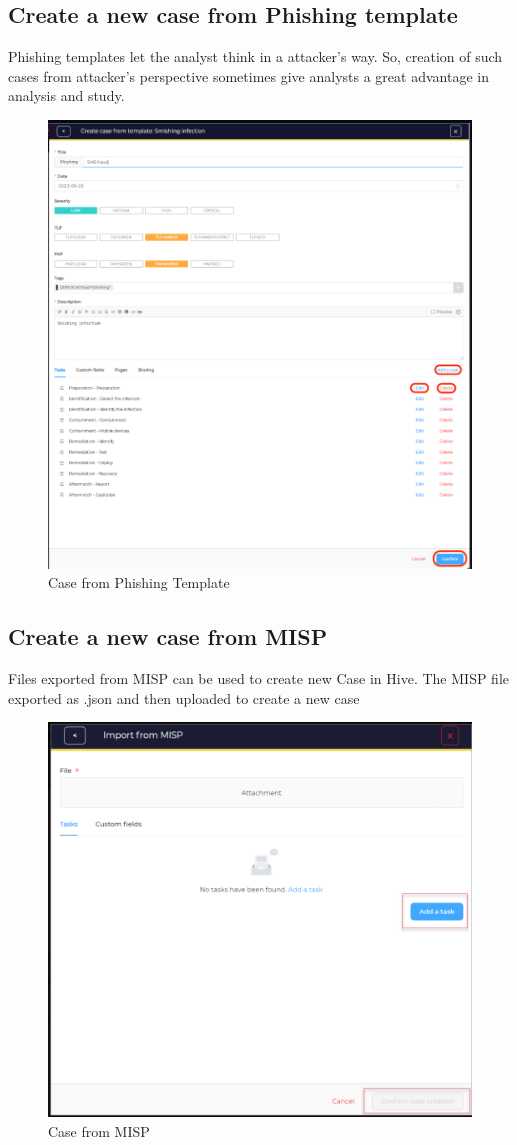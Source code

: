 \documentclass{book}
\begin{document}
\subsection{Create a new case from Phishing template}
Phishing templates let the analyst think in a attacker’s way. So, creation of such cases from attacker’s
perspective sometimes give analysts a great advantage in analysis and study.
\bigskip
\begin{figure}[h]
    \centering
    \includegraphics[width=.8\linewidth]{Case_images/casefromphishingtemplate.png}
    \caption{Case from Phishing Template}
    \label{fig:casefromphishingtemplate}
\end{figure}

\newpage

\subsection{Create a new case from MISP}
Files exported from MISP can be used to create new Case in Hive. The MISP file exported as .json and then uploaded to create a new case
\bigskip
\begin{figure}[h]
    \centering
    \includegraphics[width=.8\linewidth]{Case_images/MISP.png}
    \caption{Case from MISP}
    \label{fig:casefromMISP}
\end{figure}
\end{document}

